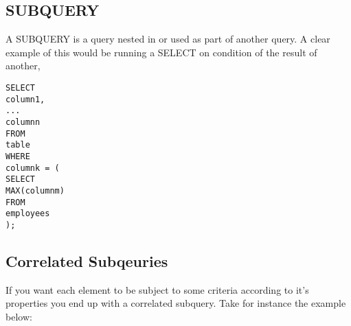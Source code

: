 \documentclass[10pt, english]{article}
\begin{document}
\subsection{SUBQUERY}
A SUBQUERY is a query nested in or used as part of another query. A clear example of this would be running a SELECT on condition of the result of another, 

\texttt{SELECT \\
\hspace*{10pt} column1, \\
... \\
\hspace*{10pt} columnn \\
FROM \\
\hspace*{10pt} table \\
WHERE \\
\hspace*{10pt} columnk = (\\
\hspace*{10pt} \hspace*{10pt} SELECT \\
\hspace*{10pt} \hspace*{10pt} \hspace*{10pt} MAX(columnm) \\
\hspace*{10pt} \hspace*{10pt} FROM \\
\hspace*{10pt} \hspace*{10pt} \hspace*{10pt} employees \\ 
);}

\subsection{Correlated Subqeuries}
If you want each element to be subject to some criteria according to it's properties you end up with a correlated subquery. Take for instance the example below:
\end{document}
